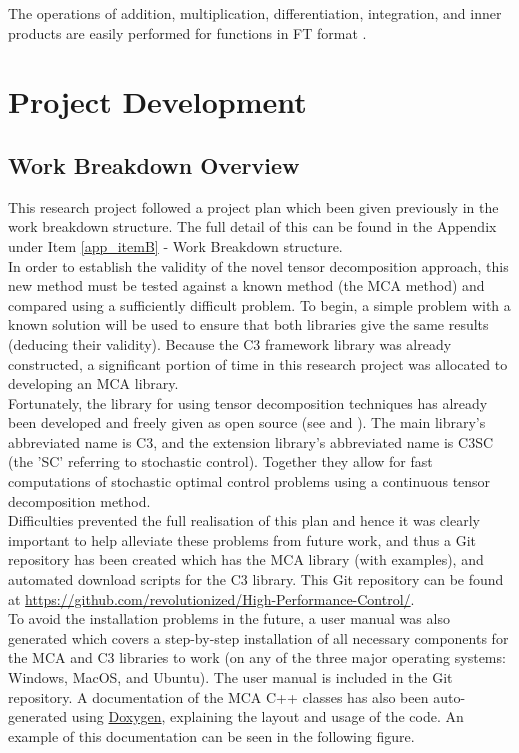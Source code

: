 \documentclass[11pt,draftd]{article}
\begin{document}
The operations of addition, multiplication, differentiation, integration, and inner products are easily performed for functions in FT format \cite{thesis}. 
\newpage

\section{Project Development} \label{ProjectProgress}
\subsection{Work Breakdown Overview}
This research project followed a project plan which been given previously in the work breakdown structure. The full detail of this can be found in the Appendix under Item \ref{app_itemB} - Work Breakdown structure. \\

In order to establish the validity of the novel tensor decomposition approach, this new method must be tested against a known method (the MCA method) and compared using a sufficiently difficult problem. To begin, a simple problem with a known solution will be used to ensure that both libraries give the same results (deducing their validity). Because the C3 framework library was already constructed, a significant portion of time in this research project was allocated to developing an MCA library. \\

Fortunately, the library for using tensor decomposition techniques has already been developed and freely given as open source (see \cite{c3c} and \cite{c3cs}). The main library's abbreviated name is C3, and the extension library’s abbreviated name is C3SC (the 'SC' referring to stochastic control). Together they allow for fast computations of stochastic optimal control problems using a continuous tensor decomposition method. \\

Difficulties prevented the full realisation of this plan and hence it was clearly important to help alleviate these problems from future work, and thus a Git repository has been created which has the MCA library (with examples), and automated download scripts for the C3 library. This Git repository can be found at \url{https://github.com/revolutionized/High-Performance-Control/}. \\

To avoid the installation problems in the future, a user manual was also generated which covers a step-by-step installation of all necessary components for the MCA and C3 libraries to work (on any of the three major operating systems: Windows, MacOS, and Ubuntu). The user manual is included in the Git repository. A documentation of the MCA C++ classes has also been auto-generated using \href{https://www.stack.nl/~dimitri/doxygen/}{Doxygen}, explaining the layout and usage of the code. An example of this documentation can be seen in the following figure. \\
\end{document}
